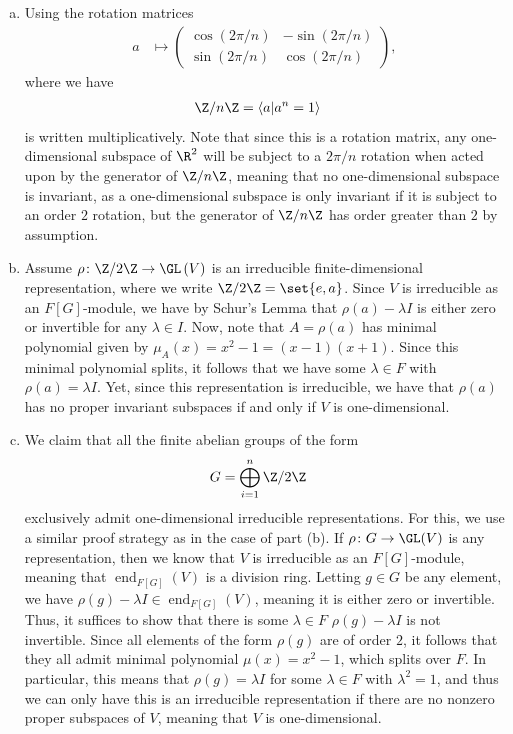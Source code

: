 \documentclass[10pt]{mypackage}
\begin{document}
\begin{solution}\hfill
  \begin{enumerate}[(a)]
    \item Using the rotation matrices
      \begin{align*}
        a &\mapsto \begin{pmatrix} \cos\left( 2\pi/n \right) & -\sin\left( 2\pi/n \right) \\ \sin\left( 2\pi/n \right) & \cos\left( 2\pi/n \right)\end{pmatrix},
      \end{align*}
      where we have
      \begin{align*}
        \Z/n\Z &= \left\langle a | a^{n} = 1 \right\rangle
      \end{align*}
      is written multiplicatively. Note that since this is a rotation matrix, any one-dimensional subspace of $\R^2$ will be subject to a $2\pi/n$ rotation when acted upon by the generator of $\Z/n\Z$, meaning that no one-dimensional subspace is invariant, as a one-dimensional subspace is only invariant if it is subject to an order $2$ rotation, but the generator of $\Z/n\Z$ has order greater than $2$ by assumption.
    \item Assume $\rho\colon \Z/2\Z\rightarrow \GL\left( V \right)$ is an irreducible finite-dimensional representation, where we write $\Z/2\Z = \set{e,a}$. Since $V$ is irreducible as an $F[G]$-module, we have by Schur's Lemma that $\rho(a) - \lambda I$ is either zero or invertible for any $\lambda\in I$. Now, note that $A = \rho(a)$ has minimal polynomial given by $\mu_A(x) = x^2 - 1 = \left( x-1 \right)\left( x+1 \right)$. Since this minimal polynomial splits, it follows that we have some $\lambda\in F$ with $\rho(a) = \lambda I$. Yet, since this representation is irreducible, we have that $\rho(a)$ has no proper invariant subspaces if and only if $V$ is one-dimensional.
    \item We claim that all the finite abelian groups of the form
      \begin{align*}
        G &= \bigoplus_{i=1}^{n}\Z/2\Z
      \end{align*}
      exclusively admit one-dimensional irreducible representations. For this, we use a similar proof strategy as in the case of part (b). If $\rho\colon G\rightarrow \GL(V)$ is any representation, then we know that $V$ is irreducible as an $F[G]$-module, meaning that $\operatorname{end}_{F[G]}(V)$ is a division ring. Letting $g\in G$ be any element, we have $\rho(g)-\lambda I\in \operatorname{end}_{F[G]}(V)$, meaning it is either zero or invertible. Thus, it suffices to show that there is some $\lambda\in F$ $\rho(g)-\lambda I$ is not invertible. Since all elements of the form $\rho(g)$ are of order $2$, it follows that they all admit minimal polynomial $\mu(x) = x^2 - 1$, which splits over $F$. In particular, this means that $\rho(g) = \lambda I$ for some $\lambda\in F$ with $\lambda^2 = 1$, and thus we can only have this is an irreducible representation if there are no nonzero proper subspaces of $V$, meaning that $V$ is one-dimensional.
  \end{enumerate}
\end{solution}
\end{document}
